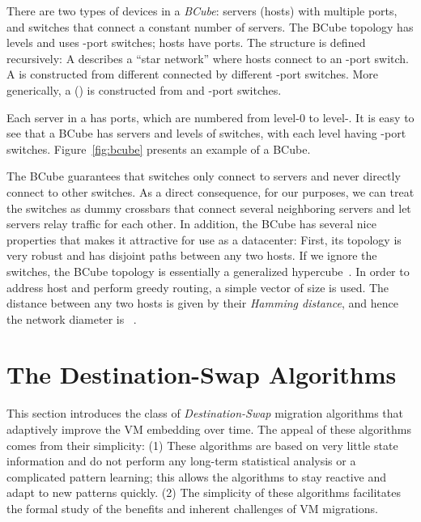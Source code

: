 \documentclass[conference]{IEEEtran}
\begin{document}
There are two types of devices in a \emph{BCube}: servers (hosts) with multiple ports, and switches that connect a constant number of servers.
The BCube topology  has  levels and uses -port switches; hosts have  ports.
The structure is defined recursively:
A   describes a ``star network'' where  hosts connect to an -port switch.
A  is constructed from  different  connected by  different -port
switches. More generically, a  () is constructed from   and  -port switches.

Each server in a   has  ports, which are numbered from level-0 to level-. It is easy to see that a BCube has
 servers and  levels of switches, with each level
having  -port switches. Figure~\ref{fig:bcube} presents an example of a BCube.



The BCube guarantees that switches only connect to servers and never directly connect to other switches.
As a direct consequence, for our purposes, we can treat the switches as dummy crossbars that connect several neighboring servers and let servers relay traffic for each other. In addition, the BCube has several nice properties that makes it attractive for use as a datacenter: First, its topology is very robust and has
 disjoint paths between any two hosts. If we ignore the switches, the BCube topology is essentially a generalized
hypercube~\cite{generalizedHyper}. In order to address host and perform greedy routing, a  simple vector of size  is used. The distance between any two hosts is
given by their \emph{Hamming distance}, and hence the network diameter is  ~\cite{bcube2009}.





\section{The Destination-Swap Algorithms}\label{sec:algoanal}

This section introduces the class of \emph{Destination-Swap} migration algorithms that adaptively improve
the VM embedding over time. The appeal of these algorithms comes from their simplicity: (1) These algorithms are based on very little
state information and do not perform any long-term statistical analysis or a complicated pattern learning; this allows the algorithms to stay reactive and
adapt to new patterns quickly. (2) The simplicity of these algorithms facilitates the formal study of the benefits and inherent challenges of
VM migrations.
\end{document}
